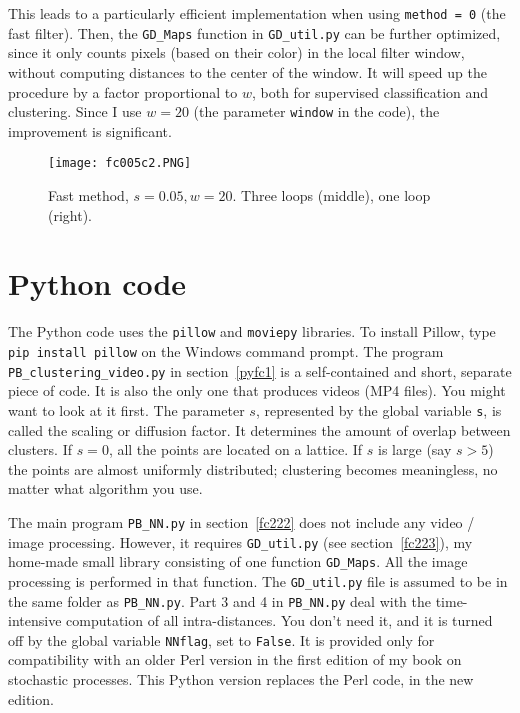 \documentclass[oneside,10pt]{book}
\renewcommand{\arraystretch}{1.4} %
\begin{document}
This leads to a particularly efficient implementation when using \texttt{method = 0} (the fast filter). Then, the \texttt{GD\_Maps} function in \texttt{GD\_util.py} can be further
optimized, since it only
counts pixels (based on their color) in the local filter window, without computing distances to the center of the window. It will speed up the procedure
by a factor proportional to $w$, both for supervised classification and clustering. Since I use $w=20$ (the parameter \texttt{window} in the code), the improvement is significant.

\begin{figure}[H]
\centering
\texttt{[image: fc005c2.PNG]}
\caption{Fast method, $s=0.05,w=20$. Three loops (middle), one loop (right).}
\label{fc005c2}
\end{figure}


\renewcommand{\arraystretch}{1.0} %
\renewcommand{\arraystretch}{1.4} %

\section{Python code}\label{pythonviz3}

The Python code uses the \texttt{pillow} and \texttt{moviepy} libraries. To install Pillow, type
\texttt{pip install pillow} on the Windows command prompt. The program \texttt{PB\_clustering\_video.py} in section~\ref{pyfc1} is a self-contained and short, separate piece of code. It is also the only one that produces videos (MP4 files).
You might want to look at it first. The parameter $s$, represented by the
global variable \texttt{s}, is called the scaling or diffusion factor. It  determines the amount of overlap between clusters. If $s=0$,
all the points are located on a lattice. If $s$ is large (say $s>5$) the points are almost uniformly distributed; clustering becomes
meaningless, no matter what algorithm you use.

The main program \texttt{PB\_NN.py} in section~\ref{fc222} does not include any video / image processing. However, it requires
\texttt{GD\_util.py} (see section~\ref{fc223}), my home-made small library consisting of one function \texttt{GD\_Maps}. All the image processing is performed in that function. The \texttt{GD\_util.py} file is assumed to be in the same folder as \texttt{PB\_NN.py}. Part 3 and 4 in \texttt{PB\_NN.py} deal with the time-intensive computation of all intra-distances. You don't need it, and it is turned off by the global
variable \texttt{NNflag}, set to \texttt{False}. It is provided only for compatibility with an older Perl version in the first edition of my book on stochastic processes. This Python version replaces the Perl code, in the new edition.
\end{document}
